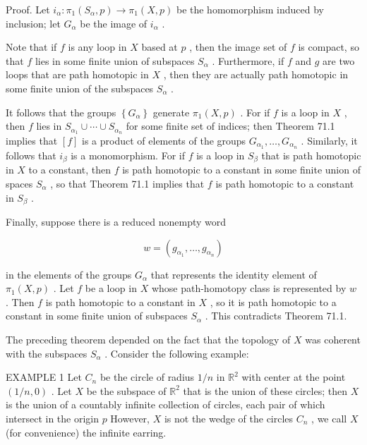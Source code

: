 \documentclass[10pt]{article}
\begin{document}
Proof. Let \({i}_{\alpha } : {\pi }_{1}\left( {{S}_{\alpha },p}\right)  \rightarrow  {\pi }_{1}\left( {X,p}\right)\) be the homomorphism induced by inclusion; let \({G}_{\alpha }\) be the image of \({i}_{\alpha }\) .

Note that if \(f\) is any loop in \(X\) based at \(p\) , then the image set of \(f\) is compact, so that \(f\) lies in some finite union of subspaces \({S}_{\alpha }\) . Furthermore, if \(f\) and \(g\) are two loops that are path homotopic in \(X\) , then they are actually path homotopic in some finite union of the subspaces \({S}_{\alpha }\) .

It follows that the groups \(\left\{  {G}_{\alpha }\right\}\) generate \({\pi }_{1}\left( {X,p}\right)\) . For if \(f\) is a loop in \(X\) , then \(f\) lies in \({S}_{{\alpha }_{1}} \cup  \cdots  \cup  {S}_{{\alpha }_{n}}\) for some finite set of indices; then Theorem 71.1 implies that \(\left\lbrack  f\right\rbrack\) is a product of elements of the groups \({G}_{{\alpha }_{1}},\ldots ,{G}_{{\alpha }_{n}}\) . Similarly, it follows that \({i}_{\beta }\) is a monomorphism. For if \(f\) is a loop in \({S}_{\beta }\) that is path homotopic in \(X\) to a constant, then \(f\) is path homotopic to a constant in some finite union of spaces \({S}_{\alpha }\) , so that Theorem 71.1 implies that \(f\) is path homotopic to a constant in \({S}_{\beta }\) .

Finally, suppose there is a reduced nonempty word

\[
w = \left( {{g}_{{\alpha }_{1}},\ldots ,{g}_{{\alpha }_{n}}}\right)
\]

in the elements of the groups \({G}_{\alpha }\) that represents the identity element of \({\pi }_{1}\left( {X,p}\right)\) . Let \(f\) be a loop in \(X\) whose path-homotopy class is represented by \(w\) . Then \(f\) is path homotopic to a constant in \(X\) , so it is path homotopic to a constant in some finite union of subspaces \({S}_{\alpha }\) . This contradicts Theorem 71.1.

The preceding theorem depended on the fact that the topology of \(X\) was coherent with the subspaces \({S}_{\alpha }\) . Consider the following example:

EXAMPLE 1 Let \({C}_{n}\) be the circle of radius \(1/n\) in \({\mathbb{R}}^{2}\) with center at the point \(\left( {1/n,0}\right)\) . Let \(X\) be the subspace of \({\mathbb{R}}^{2}\) that is the union of these circles; then \(X\) is the union of a countably infinite collection of circles, each pair of which intersect in the origin \(p\) However, \(X\) is not the wedge of the circles \({C}_{n}\) , we call \(X\) (for convenience) the infinite earring.
\end{document}
